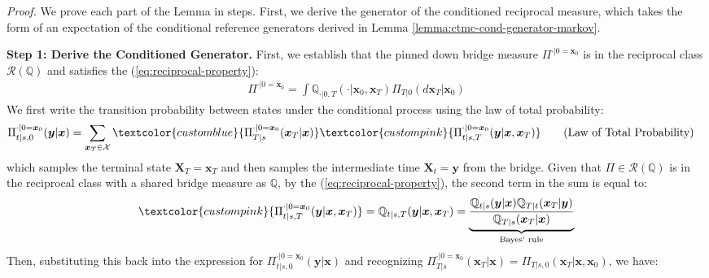 \documentclass{article}
\newcommand{\bluetext}[1]{\textcolor{customblue}{#1}}
\newcommand{\pinktext}[1]{\textcolor{custompink}{#1}}
\begin{document}
\textit{Proof.} We prove each part of the Lemma in steps. First, we derive the  generator of the conditioned reciprocal measure, which takes the form of an expectation of the conditional reference generators derived in Lemma \ref{lemma:ctmc-cond-generator-markov}.

\textbf{Step 1: Derive the Conditioned Generator. }
First, we establish that the pinned down bridge measure $\Pi^{\cdot|0=\boldsymbol{x}_0}$ is in the reciprocal class $\mathcal{R}(\mathbb{Q})$ and satisfies the (\ref{eq:reciprocal-property}):
\begin{align}
    \Pi ^{\cdot|0=\boldsymbol{x}_0}=\int\mathbb{Q}_{\cdot|0,T}(\cdot|\boldsymbol{x}_0, \boldsymbol{x}_T)\Pi_{T|0}(d\boldsymbol{x}_T|\boldsymbol{x}_0)\tag{Pinned-Down Bridge}
\end{align}
We first write the transition probability between states under the conditional process using the law of total probability:
\begin{align}
\Pi^{\cdot|0=\boldsymbol{x}_0}_{t|s, 0}(\boldsymbol{y}|\boldsymbol{x})&=\sum_{\boldsymbol{x}_T\in \mathcal{X}}\bluetext{\Pi_{T|s}^{\cdot|0=\boldsymbol{x}_0}(\boldsymbol{x}_T|\boldsymbol{x})}\pinktext{\Pi^{\cdot |0=\boldsymbol{x}_0}_{t|s,T}(\boldsymbol{y}|\boldsymbol{x}, \boldsymbol{x}_T)}\tag{Law of Total Probability}
\end{align}
which samples the terminal state $\boldsymbol{X}_T=\boldsymbol{x}_T$ and then samples the intermediate time $\boldsymbol{X}_t=\boldsymbol{y}$ from the bridge. Given that $\Pi\in \mathcal{R}(\mathbb{Q})$ is in the reciprocal class with a shared bridge measure as $\mathbb{Q}$, by the (\ref{eq:reciprocal-property}), the second term in the sum is equal to:
\begin{align}
    \pinktext{\Pi^{\cdot |0=\boldsymbol{x}_0}_{t|s,T}(\boldsymbol{y}|\boldsymbol{x}, \boldsymbol{x}_T)}=\mathbb{Q}_{t|s,T}(\boldsymbol{y}|\boldsymbol{x}, \boldsymbol{x}_T)=\underbrace{\frac{\mathbb{Q}_{t|s}(\boldsymbol{y}|\boldsymbol{x})\mathbb{Q}_{T|t}(\boldsymbol{x}_T|\boldsymbol{y})}{\mathbb{Q}_{T|s}(\boldsymbol{x}_T|\boldsymbol{x})}}_{\text{Bayes' rule}}
\end{align}
Then, substituting this back into the expression for $\Pi^{\cdot|0=\boldsymbol{x}_0}_{t|s, 0}(\boldsymbol{y}|\boldsymbol{x})$ and recognizing $\Pi_{T|s}^{\cdot|0=\boldsymbol{x}_0}(\boldsymbol{x}_T|\boldsymbol{x})=\Pi_{T|s,0}(\boldsymbol{x}_T|\boldsymbol{x}, \boldsymbol{x}_0)$, we have:
\end{document}
